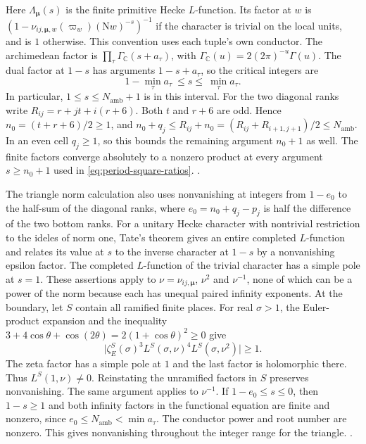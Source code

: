 Here \(\Lambda_{\boldsymbol\mu}(s)\) is the finite primitive Hecke
\(L\)-function. Its factor at \(w\) is
\((1-\nu_{ij,\boldsymbol\mu,w}(\varpi_w)(\mathrm Nw)^{-s})^{-1}\)
if the character is trivial on the local units, and is \(1\) otherwise.
This convention uses each tuple's own conductor. The archimedean
factor is \(\prod_\tau\Gamma_{\mathbb C}(s+a_\tau)\), with
\(\Gamma_{\mathbb C}(u)=2(2\pi)^{-u}\Gamma(u)\). The dual factor at
\(1-s\) has arguments \(1-s+a_\tau\), so the critical integers are
\[
   1-\min_\tau a_\tau\ \le s\le\ \min_\tau a_\tau .
\]
In particular, \(1\le s\le N_{\mathrm{amb}}+1\) is in this interval.
For the two diagonal ranks write
\(R_{ij}=r+jt+i(r+6)\). Both \(t\) and \(r+6\) are odd. Hence
\(n_0=(t+r+6)/2\ge1\), and
\(n_0+q_j\le R_{ij}+n_0=(R_{ij}+R_{i+1,j+1})/2\le N_{\mathrm{amb}}\).
In an even cell \(q_j\ge1\), so this bounds the remaining argument
\(n_0+1\) as well. The finite factors converge absolutely to a
nonzero product at every argument \(s\ge n_0+1\) used in
\eqref{eq:period-square-ratios}.
.

The triangle norm calculation also uses nonvanishing at integers
from \(1-e_0\) to the half-sum of the diagonal ranks, where
\(e_0=n_0+q_j-p_j\) is half the difference of the two bottom ranks.
For a unitary Hecke character with nontrivial restriction to the
ideles of norm one,
Tate's theorem gives an entire completed \(L\)-function and relates
its value at \(s\) to the inverse character at \(1-s\) by a
nonvanishing epsilon factor. The completed \(L\)-function of the
trivial character has a simple pole at \(s=1\).
\cite[Chapter~XV, \S4]{tate-thesis}
These assertions apply to \(\nu=\nu_{ij,\boldsymbol\mu}\), \(\nu^2\)
and \(\nu^{-1}\), none of which can be a power of the norm because
each has unequal paired infinity exponents.
At the boundary, let \(S\) contain all ramified finite places. For real
\(\sigma>1\), the Euler-product expansion and the inequality
\(3+4\cos\theta+\cos(2\theta)=2(1+\cos\theta)^2\ge0\) give
\[
  \big|\zeta_E^S(\sigma)^3 L^S(\sigma,\nu)^4
                L^S(\sigma,\nu^2)\big|\ge1.
\]
The zeta factor has a simple pole at \(1\) and the last factor is
holomorphic there. Thus \(L^S(1,\nu)\ne0\). Reinstating the unramified
factors in \(S\) preserves nonvanishing. The same argument applies to
\(\nu^{-1}\). If \(1-e_0\le s\le0\), then \(1-s\ge1\) and both
infinity factors in the functional equation are finite and nonzero,
since \(e_0\le N_{\mathrm{amb}}<\min a_\tau\). The conductor power and
root number are nonzero. This gives nonvanishing throughout the
integer range for the triangle.
.

